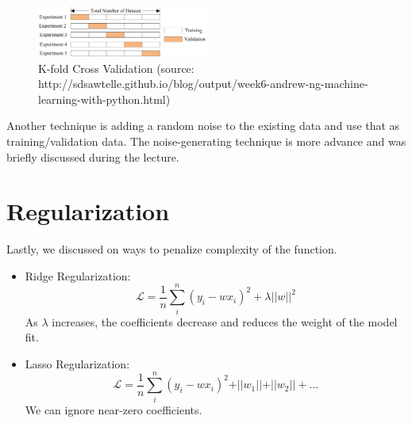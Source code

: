 \begin{figure}[ht]
  \begin{center}
    \includegraphics[width=0.5\textwidth]{figures/figure3.png}
    \caption{
      K-fold Cross Validation (source: http://sdsawtelle.github.io/blog/output/week6-andrew-ng-machine-learning-with-python.html)}
    \label{fig:example_figure}
  \end{center}
\end{figure}

Another technique is adding a random noise to the existing data and use that as training/validation data. The noise-generating technique is more advance and was briefly discussed during the lecture.

\section{Regularization}
Lastly, we discussed on ways to penalize complexity of the function.
\begin{itemize}
\item Ridge Regularization: \[\mathcal{L}=\frac{1}{n}\sum_i^n(y_i-wx_i)^2+\lambda \vert\vert w\vert\vert^2\]As \(\lambda\) increases, the coefficients decrease and reduces the weight of the model fit.
\item Lasso Regularization: \[\mathcal{L}=\frac{1}{n}\sum_i^n(y_i-wx_i)^2+\vert\vert w_1\vert\vert+\vert\vert w_2\vert\vert+...\] We can ignore near-zero coefficients.
\end{itemize}
